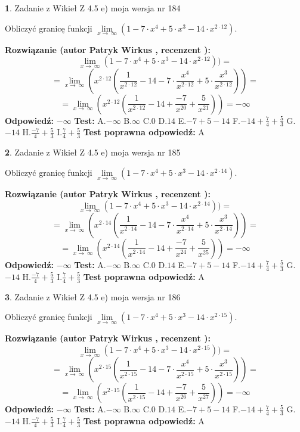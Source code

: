 \documentclass[12pt, a4paper]{article}
\theoremstyle{definition} %
\newtheorem{zad}{}
\newcommand{\zadStart}[1]{\begin{zad}#1\newline}
\newcommand{\zadStop}{\end{zad}}
\newcommand{\rozwStart}[2]{\noindent \textbf{Rozwiązanie (autor #1 , recenzent #2): }\newline}
\newcommand{\rozwStop}{\newline}
\newcommand{\odpStart}{\noindent \textbf{Odpowiedź:}\newline}
\newcommand{\odpStop}{\newline}
\newcommand{\testStart}{\noindent \textbf{Test:}\newline}
\newcommand{\testStop}{\newline}
\newcommand{\kluczStart}{\noindent \textbf{Test poprawna odpowiedź:}\newline}
\newcommand{\kluczStop}{\newline}
\begin{document}
\zadStart{Zadanie z Wikieł Z 4.5 e) moja wersja nr 184}



Obliczyć granicę funkcji  $\lim\limits_{x\to\ \infty}(1 - 7 \cdot x^{4}+5 \cdot x^{3}- 14 \cdot x^{2\cdot12})$.
\zadStop
\rozwStart{Patryk Wirkus}{}
$$\lim\limits_{x\to\ \infty}(1 - 7 \cdot x^{4}+5 \cdot x^{3}- 14 \cdot x^{2\cdot12}))=$$
$$=\lim\limits_{x\to\ \infty}(x^{2\cdot12}(\frac{1}{x^{2\cdot12}}-14 -7 \cdot \frac{x^{4}}{x^{2\cdot12}}+5 \cdot \frac{x^{3}}{x^{2\cdot12}}))=$$
$$=\lim\limits_{x\to\ \infty}(x^{2\cdot12}(\frac{1}{x^{2\cdot12}}-14 + \frac{-7}{x^{20}}+ \frac{5}{x^{21}}))=-\infty$$
\rozwStop
\odpStart
$-\infty$
\odpStop
\testStart
A.$-\infty$ B.$\infty$ C.$0$ D.$14$ E.$-7 + 5 - 14$
F.$-14+\frac{7}{4}+\frac{5}{3}$ G.$-14$
H.$\frac{-7}{4}+\frac{5}{3}$
I.$\frac{7}{4}+\frac{5}{3}$
\testStop
\kluczStart
A
\kluczStop



\zadStart{Zadanie z Wikieł Z 4.5 e) moja wersja nr 185}



Obliczyć granicę funkcji  $\lim\limits_{x\to\ \infty}(1 - 7 \cdot x^{4}+5 \cdot x^{3}- 14 \cdot x^{2\cdot14})$.
\zadStop
\rozwStart{Patryk Wirkus}{}
$$\lim\limits_{x\to\ \infty}(1 - 7 \cdot x^{4}+5 \cdot x^{3}- 14 \cdot x^{2\cdot14}))=$$
$$=\lim\limits_{x\to\ \infty}(x^{2\cdot14}(\frac{1}{x^{2\cdot14}}-14 -7 \cdot \frac{x^{4}}{x^{2\cdot14}}+5 \cdot \frac{x^{3}}{x^{2\cdot14}}))=$$
$$=\lim\limits_{x\to\ \infty}(x^{2\cdot14}(\frac{1}{x^{2\cdot14}}-14 + \frac{-7}{x^{24}}+ \frac{5}{x^{25}}))=-\infty$$
\rozwStop
\odpStart
$-\infty$
\odpStop
\testStart
A.$-\infty$ B.$\infty$ C.$0$ D.$14$ E.$-7 + 5 - 14$
F.$-14+\frac{7}{4}+\frac{5}{3}$ G.$-14$
H.$\frac{-7}{4}+\frac{5}{3}$
I.$\frac{7}{4}+\frac{5}{3}$
\testStop
\kluczStart
A
\kluczStop



\zadStart{Zadanie z Wikieł Z 4.5 e) moja wersja nr 186}



Obliczyć granicę funkcji  $\lim\limits_{x\to\ \infty}(1 - 7 \cdot x^{4}+5 \cdot x^{3}- 14 \cdot x^{2\cdot15})$.
\zadStop
\rozwStart{Patryk Wirkus}{}
$$\lim\limits_{x\to\ \infty}(1 - 7 \cdot x^{4}+5 \cdot x^{3}- 14 \cdot x^{2\cdot15}))=$$
$$=\lim\limits_{x\to\ \infty}(x^{2\cdot15}(\frac{1}{x^{2\cdot15}}-14 -7 \cdot \frac{x^{4}}{x^{2\cdot15}}+5 \cdot \frac{x^{3}}{x^{2\cdot15}}))=$$
$$=\lim\limits_{x\to\ \infty}(x^{2\cdot15}(\frac{1}{x^{2\cdot15}}-14 + \frac{-7}{x^{26}}+ \frac{5}{x^{27}}))=-\infty$$
\rozwStop
\odpStart
$-\infty$
\odpStop
\testStart
A.$-\infty$ B.$\infty$ C.$0$ D.$14$ E.$-7 + 5 - 14$
F.$-14+\frac{7}{4}+\frac{5}{3}$ G.$-14$
H.$\frac{-7}{4}+\frac{5}{3}$
I.$\frac{7}{4}+\frac{5}{3}$
\testStop
\kluczStart
A
\kluczStop
\end{document}
